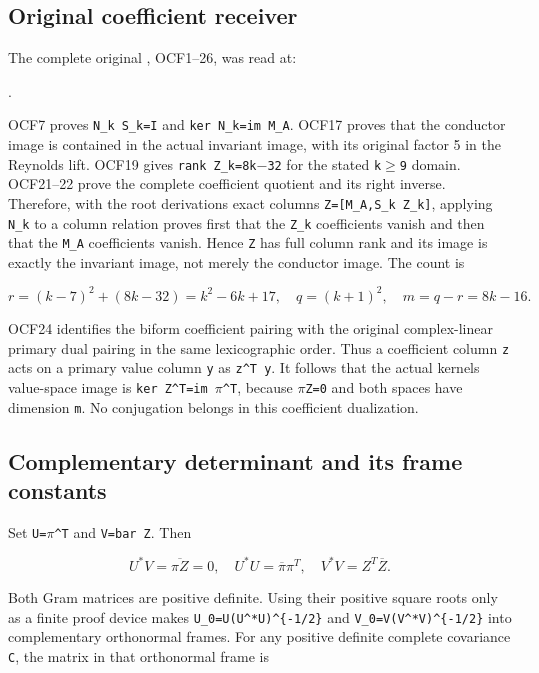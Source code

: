\documentclass[11pt]{article}
\begin{document}
\subsection{Original coefficient receiver}\label{mrreview:original-coefficient-receiver}

The complete original , OCF1--26, was read at:

.

OCF7 proves \texttt{N\_k\ S\_k=I} and \texttt{ker\ N\_k=im\ M\_A}. OCF17 proves that the conductor image is contained in the actual invariant image, with its original factor 5 in the Reynolds lift. OCF19 gives \texttt{rank\ Z\_k=8k\ensuremath{-}32} for the stated \texttt{k\ensuremath{\ge}9} domain. OCF21--22 prove the complete coefficient quotient and its right inverse. Therefore, with the root derivation\textquotesingle s exact columns \texttt{Z={[}M\_A,S\_k\ Z\_k{]}}, applying \texttt{N\_k} to a column relation proves first that the \texttt{Z\_k} coefficients vanish and then that the \texttt{M\_A} coefficients vanish. Hence \texttt{Z} has full column rank and its image is exactly the invariant image, not merely the conductor image. The count is

\[
r=(k-7)^2+(8k-32)=k^2-6k+17,
\quad q=(k+1)^2,
\quad m=q-r=8k-16.
\]

OCF24 identifies the biform coefficient pairing with the original complex-linear primary dual pairing in the same lexicographic order. Thus a coefficient column \texttt{z} acts on a primary value column \texttt{y} as \texttt{z\^{}T\ y}. It follows that the actual kernel\textquotesingle s value-space image is \texttt{ker\ Z\^{}T=im\ \ensuremath{\pi}\^{}T}, because \texttt{\ensuremath{\pi}Z=0} and both spaces have dimension \texttt{m}. No conjugation belongs in this coefficient dualization.

\subsection{Complementary determinant and its frame constants}\label{mrreview:complementary-determinant-and-its-frame-constants}

Set \texttt{U=\ensuremath{\pi}\^{}T} and \texttt{V=bar\ Z}. Then

\[
U^*V=\overline{\pi Z}=0,
\quad U^*U=\overline\pi\pi^T,
\quad V^*V=Z^T\overline Z.
\]

Both Gram matrices are positive definite. Using their positive square roots only as a finite proof device makes \texttt{U\_0=U(U\^{}*U)\^{}\{-1/2\}} and \texttt{V\_0=V(V\^{}*V)\^{}\{-1/2\}} into complementary orthonormal frames. For any positive definite complete covariance \texttt{C}, the matrix in that orthonormal frame is
\end{document}

